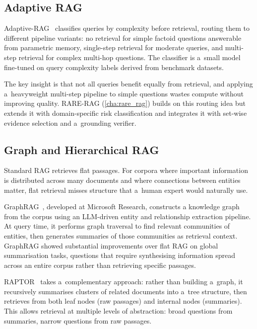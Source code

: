 \subsection{Adaptive RAG}
\label{subsec:adaptive_rag}

Adaptive-RAG~\cite{jeong2024adaptiverag} classifies queries by complexity before
retrieval, routing them to different pipeline variants: no retrieval for simple
factoid questions answerable from parametric memory, single-step retrieval for
moderate queries, and multi-step retrieval for complex multi-hop questions.
The classifier is a~small model fine-tuned on query complexity labels derived
from benchmark datasets.

The key insight is that not all queries benefit equally from retrieval, and applying
a~heavyweight multi-step pipeline to simple questions wastes compute without improving
quality.
RARE-RAG (\cref{cha:rare_rag}) builds on this routing idea but extends it with
domain-specific risk classification and integrates it with set-wise evidence
selection and a~grounding verifier.

\subsection{Graph and Hierarchical RAG}
\label{subsec:graph_rag}

Standard RAG retrieves flat passages.
For corpora where important information is distributed across many documents and
where connections between entities matter, flat retrieval misses structure that
a~human expert would naturally use.

GraphRAG~\cite{edge2024graphrag}, developed at Microsoft Research, constructs a
knowledge graph from the corpus using an LLM-driven entity and relationship
extraction pipeline.
At query time, it performs graph traversal to find relevant communities of entities,
then generates summaries of those communities as retrieval context.
GraphRAG showed substantial improvements over flat RAG on global summarisation
tasks, questions that require synthesising information spread across an entire
corpus rather than retrieving specific passages.

RAPTOR~\cite{sarthi2024raptor} takes a~complementary approach: rather than building
a~graph, it recursively summarises clusters of related documents into a~tree
structure, then retrieves from both leaf nodes (raw passages) and internal nodes
(summaries).
This allows retrieval at multiple levels of abstraction: broad questions from
summaries, narrow questions from raw passages.

